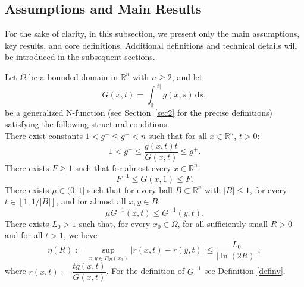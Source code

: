 \documentclass[10pt,reqno]{amsart}
\newcommand *\w{^\wedge}
\theoremstyle{definition}
\numberwithin{equation}{section}
\begin{document}
\subsection{Assumptions and Main Results}\label{sec1.2}
For the sake of clarity, in this subsection, we present only the main assumptions, key results, and core definitions. Additional definitions and technical details will be introduced in the subsequent sections.

Let $\Omega$ be a bounded domain in $\mathbb{R}^n$ with \( n \geq 2 \), and let 
\[G(x,t) = \int_0^{\vert t\vert} g(x,s)\, \mathrm{d}s,\]
be a generalized \textnormal{N}-function (see Section~\ref{sec2} for the precise definitions) satisfying the following structural conditions:\\
There exist constants $1 < g^- \leq g^+ < n$ such that for all $x \in \mathbb{R}^n$, $t > 0$:
\begin{equation}\label{D22}
1 < g^- \leq \frac{g(x,t)t}{G(x,t)} \leq g^+ .
\tag{G0}
\end{equation}
There exists $F \geq 1$ such that for almost every $x \in \mathbb{R}^n$:
\begin{equation}\label{GG1}
F^{-1} \leq G(x,1) \leq F.
\tag{G1}
\end{equation}
There exists $\mu \in (0,1]$ such that for every ball $B \subset \mathbb{R}^n$ with $|B| \leq 1$, for every $t \in [1, 1/|B|]$, and for almost all $x,y \in B$:
\begin{equation}\label{GG2}
\mu G^{-1}(x,t) \leq G^{-1}(y,t).
\tag{G2}
\end{equation}
There exists $L_0 > 1$ such that, for every $x_0 \in \Omega$, for all sufficiently small $R > 0$ and for all $t>1$, we heve
\begin{equation}\label{GG3} 
\eta(R):= \sup_{x,y \in B_R(x_0)} \left| r\left(x,t\right) - r\left(y,t\right) \right| 
\leq \frac{L_0}{|\ln (2R)|},
\tag{G3}
\end{equation}
where $r(x,t) := \dfrac{t g(x,t)}{G(x,t)}$. For the definition of $G^{-1}$ see Definition \ref{definv}.\\
\end{document}
